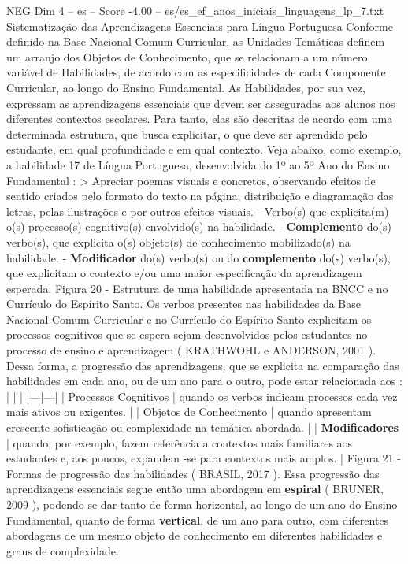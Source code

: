 \begin{textsample}{NEG Dim 4 – es – Score -4.00 – es/es\_ef\_anos\_iniciais\_linguagens\_lp\_7.txt}  \label{ex:f4_neg_214}
Sistematização das Aprendizagens Essenciais para Língua Portuguesa Conforme definido na Base Nacional Comum Curricular, as Unidades Temáticas definem um arranjo dos Objetos de Conhecimento, que se relacionam a um número variável de Habilidades, de acordo com as especificidades de cada Componente Curricular, ao longo do Ensino Fundamental.
As Habilidades, por sua vez, expressam as aprendizagens essenciais que devem ser asseguradas aos alunos nos diferentes contextos escolares.
Para tanto, elas são descritas de acordo com uma determinada estrutura, que busca explicitar, o que deve ser aprendido pelo estudante, em qual profundidade e em qual contexto.
Veja abaixo, como exemplo, a habilidade 17 de Língua Portuguesa, desenvolvida do 1º ao 5º Ano do Ensino Fundamental : > Apreciar poemas visuais e concretos, observando efeitos de sentido criados pelo formato do texto na página, distribuição e diagramação das letras, pelas ilustrações e por outros efeitos visuais. - Verbo(s) que explicita(m) o(s) processo(s) cognitivo(s) envolvido(s) na habilidade. - \textbf{Complemento} do(s) verbo(s), que explicita o(s) objeto(s) de conhecimento mobilizado(s) na habilidade. - \textbf{Modificador} do(s) verbo(s) ou do \textbf{complemento} do(s) verbo(s), que explicitam o contexto e/ou uma maior especificação da aprendizagem esperada.
Figura 20 - Estrutura de uma habilidade apresentada na BNCC e no Currículo do Espírito Santo.
Os verbos presentes nas habilidades da Base Nacional Comum Curricular e no Currículo do Espírito Santo explicitam os processos cognitivos que se espera sejam desenvolvidos pelos estudantes no processo de ensino e aprendizagem ( KRATHWOHL e ANDERSON, 2001 ).
Dessa forma, a progressão das aprendizagens, que se explicita na comparação das habilidades em cada ano, ou de um ano para o outro, pode estar relacionada aos : | | | |---|---| | Processos Cognitivos | quando os verbos indicam processos cada vez mais ativos ou exigentes. | | Objetos de Conhecimento | quando apresentam crescente sofisticação ou complexidade na temática abordada. | | \textbf{Modificadores} | quando, por exemplo, fazem referência a contextos mais familiares aos estudantes e, aos poucos, expandem -se para contextos mais amplos. | Figura 21 - Formas de progressão das habilidades ( BRASIL, 2017 ).
Essa progressão das aprendizagens essenciais segue então uma abordagem em \textbf{espiral} ( BRUNER, 2009 ), podendo se dar tanto de forma horizontal, ao longo de um ano do Ensino Fundamental, quanto de forma \textbf{vertical}, de um ano para outro, com diferentes abordagens de um mesmo objeto de conhecimento em diferentes habilidades e graus de complexidade.

\end{textsample}
